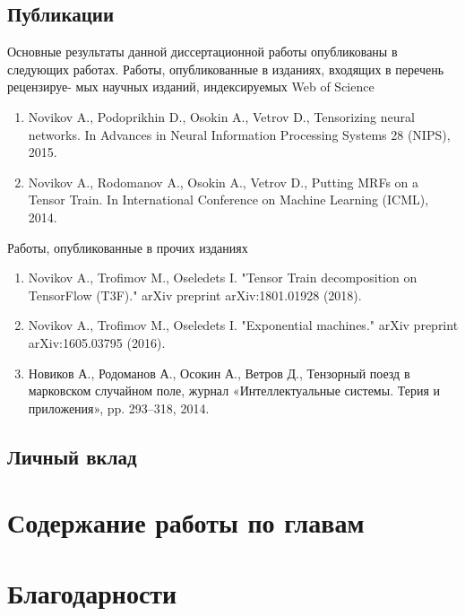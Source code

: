 \subsection{Публикации} \label{sec:intro-publications}
Основные результаты данной диссертационной работы опубликованы в следующих работах.
Работы, опубликованные в изданиях, входящих в перечень рецензируе-
мых научных изданий, индексируемых Web of Science
\begin{enumerate}
	\item Novikov A., Podoprikhin D., Osokin A., Vetrov D., Tensorizing neural networks. In Advances in Neural Information Processing Systems 28 (NIPS), 2015.
	\item Novikov A., Rodomanov A., Osokin A., Vetrov D., Putting MRFs on a Tensor Train. In International Conference on Machine Learning (ICML), 2014.
\end{enumerate}
Работы, опубликованные в прочих изданиях
\begin{enumerate}
	\item Novikov A., Trofimov M., Oseledets I. "Tensor Train decomposition on TensorFlow (T3F)." arXiv preprint arXiv:1801.01928 (2018).
	\item Novikov A., Trofimov M., Oseledets I. "Exponential machines." arXiv preprint arXiv:1605.03795 (2016).
	\item Новиков А., Родоманов А., Осокин А., Ветров Д., Тензорный поезд в марковском случайном поле, журнал «Интеллектуальные системы. Терия и приложения», pp. 293–318, 2014.
\end{enumerate}

\subsection{Личный вклад} \label{sec:intro-publications}
\section{Содержание работы по главам} \label{sec:intro-detailed-table-of-contents}
\section{Благодарности} \label{sec:intro-acknowledgment}

\newcommand{\actuality}{}
\newcommand{\progress}{}
\newcommand{\aim}{{\textbf\aimTXT}}
\newcommand{\tasks}{\textbf{\tasksTXT}}
\newcommand{\novelty}{\textbf{\noveltyTXT}}
\newcommand{\influence}{\textbf{\influenceTXT}}
\newcommand{\methods}{\textbf{\methodsTXT}}
\newcommand{\defpositions}{\textbf{\defpositionsTXT}}
\newcommand{\reliability}{\textbf{\reliabilityTXT}}
\newcommand{\probation}{\textbf{\probationTXT}}
\newcommand{\contribution}{\textbf{\contributionTXT}}
\newcommand{\publications}{\textbf{\publicationsTXT}}

